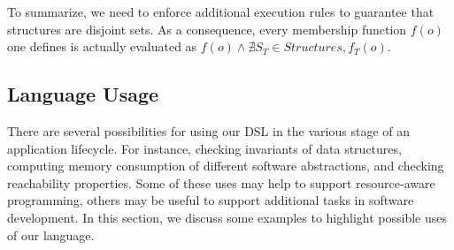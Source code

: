 To summarize, we need to enforce additional execution rules to guarantee that structures are disjoint sets.
As a consequence, every membership function $f(o)$ one defines is actually evaluated as $f(o) \wedge \nexists{S_T \in \textit{Structures}}, f_T(o) $.





\subsection{Language Usage} \label{sec:dsl-usage-examples}

There are several possibilities for using our DSL in the various stage of an application lifecycle.
For instance, checking invariants of data structures, computing memory consumption of different software abstractions, and checking reachability properties.
Some of these uses may help to support resource-aware programming, others may be useful to support additional tasks in software development.
In this section, we discuss some examples to highlight possible uses of our language.
 
